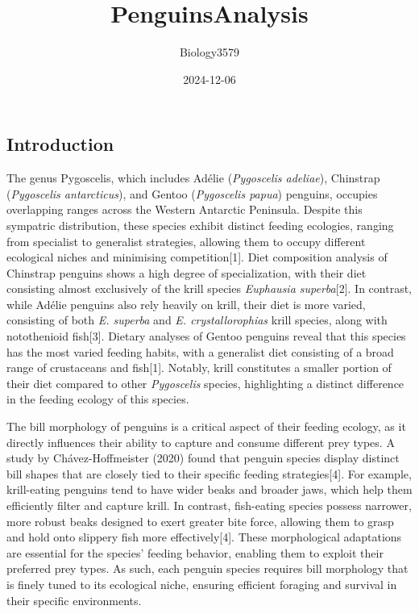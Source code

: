 \documentclass[
]{article}
\title{PenguinsAnalysis}
\author{Biology3579}
\date{2024-12-06}
\begin{document}
\maketitle

\subsection{Introduction}\label{introduction}

The genus Pygoscelis, which includes Adélie (\emph{Pygoscelis adeliae}),
Chinstrap (\emph{Pygoscelis antarcticus}), and Gentoo (\emph{Pygoscelis
papua}) penguins, occupies overlapping ranges across the Western
Antarctic Peninsula. Despite this sympatric distribution, these species
exhibit distinct feeding ecologies, ranging from specialist to
generalist strategies, allowing them to occupy different ecological
niches and minimising competition{[}1{]}. Diet composition analysis of
Chinstrap penguins shows a high degree of specialization, with their
diet consisting almost exclusively of the krill species \emph{Euphausia
superba}{[}2{]}. In contrast, while Adélie penguins also rely heavily on
krill, their diet is more varied, consisting of both \emph{E. superba}
and \emph{E. crystallorophias} krill species, along with notothenioid
fish{[}3{]}. Dietary analyses of Gentoo penguins reveal that this
species has the most varied feeding habits, with a generalist diet
consisting of a broad range of crustaceans and fish{[}1{]}. Notably,
krill constitutes a smaller portion of their diet compared to other
\emph{Pygoscelis} species, highlighting a distinct difference in the
feeding ecology of this species.

The bill morphology of penguins is a critical aspect of their feeding
ecology, as it directly influences their ability to capture and consume
different prey types. A study by Chávez-Hoffmeister (2020) found that
penguin species display distinct bill shapes that are closely tied to
their specific feeding strategies{[}4{]}. For example, krill-eating
penguins tend to have wider beaks and broader jaws, which help them
efficiently filter and capture krill. In contrast, fish-eating species
possess narrower, more robust beaks designed to exert greater bite
force, allowing them to grasp and hold onto slippery fish more
effectively{[}4{]}. These morphological adaptations are essential for
the species' feeding behavior, enabling them to exploit their preferred
prey types. As such, each penguin species requires bill morphology that
is finely tuned to its ecological niche, ensuring efficient foraging and
survival in their specific environments.
\end{document}
